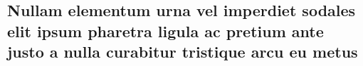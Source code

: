 \documentclass[12pt, openright, oneside, a4paper, english, brazilian]{abntex2}
\begin{document}


%
%


\begin{apendicesenv}

\partapendices





\chapter{Nullam elementum urna vel imperdiet sodales elit ipsum pharetra ligula
ac pretium ante justo a nulla curabitur tristique arcu eu metus}
\lipsum[55-57]

\end{apendicesenv}



\begin{anexosenv}

\partanexos


\end{anexosenv}
\end{document}

